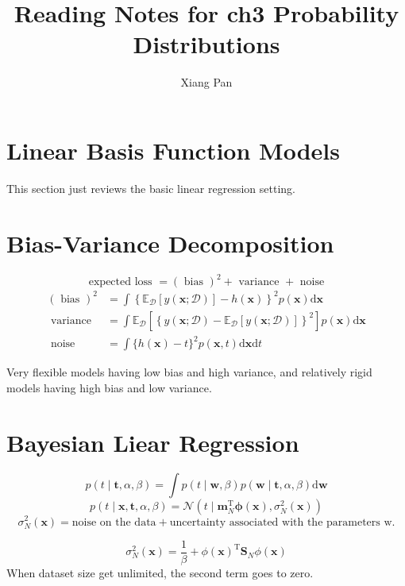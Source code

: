 \documentclass{article}
\title{Reading Notes for ch3 Probability Distributions}
\author{Xiang Pan}
\begin{document}
\maketitle
\section{Linear Basis Function Models} 
This section just reviews the basic linear regression setting. 
\section{Bias-Variance Decomposition}
$$
\text { expected loss }=(\text { bias })^{2}+\text { variance }+\text { noise }
$$
$$
\begin{aligned}
(\text { bias })^{2} &=\int\left\{\mathbb{E}_{\mathcal{D}}[y(\mathbf{x} ; \mathcal{D})]-h(\mathbf{x})\right\}^{2} p(\mathbf{x}) \mathrm{d} \mathbf{x} \\
\text { variance } &=\int \mathbb{E}_{\mathcal{D}}\left[\left\{y(\mathbf{x} ; \mathcal{D})-\mathbb{E}_{\mathcal{D}}[y(\mathbf{x} ; \mathcal{D})]\right\}^{2}\right] p(\mathbf{x}) \mathrm{d} \mathbf{x} \\
\text { noise } &=\int\{h(\mathbf{x})-t\}^{2} p(\mathbf{x}, t) \mathrm{d} \mathbf{x} \mathrm{d} t
\end{aligned}
$$

Very flexible models having low bias and high variance, and relatively rigid models having high bias and low variance.
\section{Bayesian Liear Regression}
$$
p(t \mid \mathbf{t}, \alpha, \beta)=\int p(t \mid \mathbf{w}, \beta) p(\mathbf{w} \mid \mathbf{t}, \alpha, \beta) \mathrm{d} \mathbf{w}
$$
$$
p(t \mid \mathbf{x}, \mathbf{t}, \alpha, \beta)=\mathcal{N}\left(t \mid \mathbf{m}_{N}^{\mathrm{T}} \boldsymbol{\phi}(\mathbf{x}), \sigma_{N}^{2}(\mathbf{x})\right)
$$
$$
\sigma_{N}^{2}(\mathbf{x})= \text{noise on the data} + \text{uncertainty associated with the parameters w.}
$$

$$
\sigma_{N}^{2}(\mathbf{x})=\frac{1}{\beta}+\phi(\mathbf{x})^{\mathrm{T}} \mathbf{S}_{N} \phi(\mathbf{x})
$$
When dataset size get unlimited, the second term goes to zero.




\appendix
\end{document}
